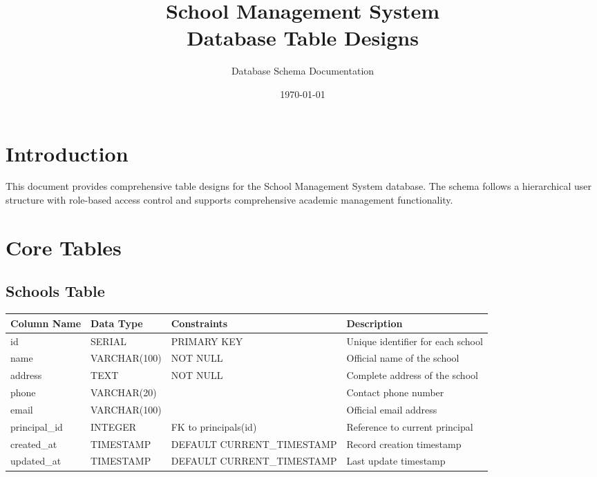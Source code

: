 \documentclass[11pt,a4paper]{article}
\title{\textbf{School Management System\\Database Table Designs}}
\author{Database Schema Documentation}
\date{\today}
\begin{document}
\maketitle

\tableofcontents
\newpage

\section{Introduction}
This document provides comprehensive table designs for the School Management System database. The schema follows a hierarchical user structure with role-based access control and supports comprehensive academic management functionality.

\section{Core Tables}

\subsection{Schools Table}
\begin{longtable}{|p{3cm}|p{3cm}|p{2cm}|p{6cm}|}
\hline
\textbf{Column Name} & \textbf{Data Type} & \textbf{Constraints} & \textbf{Description} \\
\hline
\endhead
id & SERIAL & PRIMARY KEY & Unique identifier for each school \\
\hline
name & VARCHAR(100) & NOT NULL & Official name of the school \\
\hline
address & TEXT & NOT NULL & Complete address of the school \\
\hline
phone & VARCHAR(20) & & Contact phone number \\
\hline
email & VARCHAR(100) & & Official email address \\
\hline
principal\_id & INTEGER & FK to principals(id) & Reference to current principal \\
\hline
created\_at & TIMESTAMP & DEFAULT CURRENT\_TIMESTAMP & Record creation timestamp \\
\hline
updated\_at & TIMESTAMP & DEFAULT CURRENT\_TIMESTAMP & Last update timestamp \\
\hline
\end{longtable}
\end{document}
